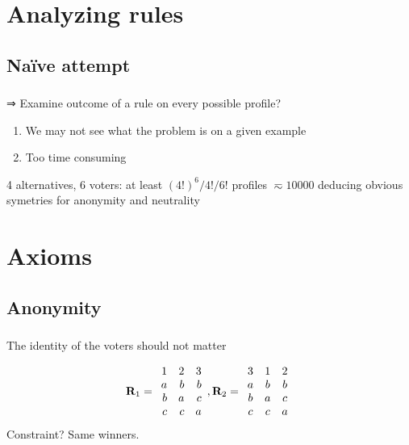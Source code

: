 \documentclass[french, english]{beamer}
\begin{document}
\section{Analyzing rules}
\subsection{Naïve attempt}
\begin{frame}
	\frametitle{\subsecname}
	⇒ Examine outcome of a rule on every possible profile?
	\begin{enumerate}
		\item We may not see what the problem is on a given example
		\item Too time consuming
	\end{enumerate}
	4 alternatives, 6 voters: at least $(4!)^6/4!/6!$ profiles $\eqsim \si{10000}$ {\tiny deducing obvious symetries for anonymity and neutrality}
\end{frame}

\section{Axioms}
\subsection{Anonymity}
\begin{frame}
	\frametitle{\subsecname}
	\begin{definition}[Anonymity]
		The identity of the voters should not matter
	\end{definition}
	\begin{equation}
		\mathbf{R}_1 =
		\begin{array}{rrr}
			1&2&3\\
			a&b&b\\
			b&a&c\\
			c&c&a\\
		\end{array},
		\mathbf{R}_2 =
		\begin{array}{ccc}
			3&1&2\\
			a&b&b\\
			b&a&c\\
			c&c&a\\
		\end{array}
	\end{equation}
	Constraint? \pause Same winners.
\end{frame}
\end{document}
